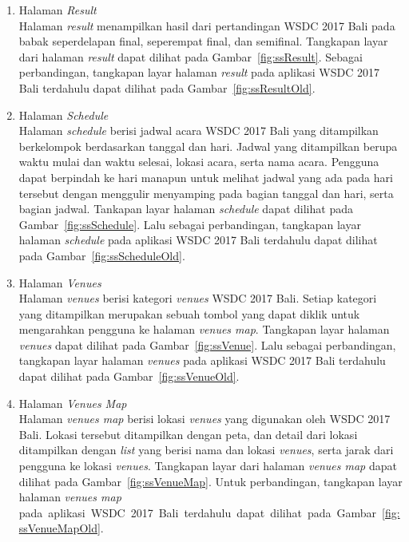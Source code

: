 \begin{enumerate}
	\item Halaman \textit{Result} \\
		Halaman \textit{result} menampilkan hasil dari pertandingan WSDC 2017 Bali pada babak seperdelapan final, seperempat final, dan semifinal. Tangkapan layar dari halaman \textit{result} dapat dilihat pada Gambar~\ref{fig:ssResult}. Sebagai perbandingan, tangkapan layar halaman \textit{result} pada aplikasi WSDC 2017 Bali terdahulu dapat dilihat pada Gambar~\ref{fig:ssResultOld}.
		
	\item Halaman \textit{Schedule} \\
		Halaman \textit{schedule} berisi jadwal acara WSDC 2017 Bali yang ditampilkan berkelompok berdasarkan tanggal dan hari. Jadwal yang ditampilkan berupa waktu mulai dan waktu selesai, lokasi acara, serta nama acara. Pengguna dapat berpindah ke hari manapun untuk melihat jadwal yang ada pada hari tersebut dengan menggulir menyamping pada bagian tanggal dan hari, serta bagian jadwal. Tankapan layar halaman \textit{schedule} dapat dilihat pada Gambar~\ref{fig:ssSchedule}. Lalu sebagai perbandingan, tangkapan layar halaman \textit{schedule} pada aplikasi WSDC 2017 Bali terdahulu dapat dilihat pada Gambar~\ref{fig:ssScheduleOld}.
		
	\item Halaman \textit{Venues} \\
		Halaman \textit{venues} berisi kategori \textit{venues} WSDC 2017 Bali. Setiap kategori yang ditampilkan merupakan sebuah tombol yang dapat diklik untuk mengarahkan pengguna ke halaman \textit{venues map}. Tangkapan layar halaman \textit{venues} dapat dilihat pada Gambar~\ref{fig:ssVenue}. Lalu sebagai perbandingan, tangkapan layar halaman \textit{venues} pada aplikasi WSDC 2017 Bali terdahulu dapat dilihat pada Gambar~\ref{fig:ssVenueOld}.
		
	\item Halaman \textit{Venues Map} \\
		Halaman \textit{venues map} berisi lokasi \textit{venues} yang digunakan oleh WSDC 2017 Bali. Lokasi tersebut ditampilkan dengan peta, dan detail dari lokasi ditampilkan dengan \textit{list} yang berisi nama dan lokasi \textit{venues}, serta jarak dari pengguna ke lokasi \textit{venues}. Tangkapan layar dari halaman \textit{venues map} dapat dilihat pada Gambar~\ref{fig:ssVenueMap}. Untuk perbandingan, tangkapan layar halaman \textit{venues map} pada~aplikasi~WSDC~2017~Bali~terdahulu~dapat~dilihat~pada~Gambar~\ref{fig:ssVenueMapOld}.

	
\end{enumerate}

